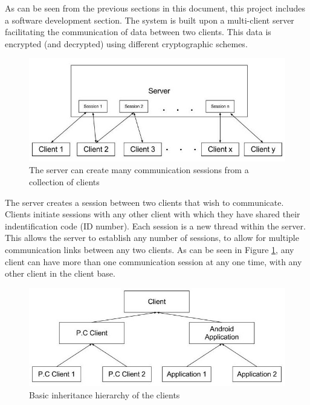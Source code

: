 \documentclass[a4paper,11pt]{article}
\begin{document}
As can be seen from the previous sections in this document, this project includes a software development section. The system is built upon a multi-client server facilitating the communication of data between two clients.  This data is encrypted (and decrypted) using different cryptographic schemes.

\begin{figure}[htb]
\centering
\includegraphics[scale=0.35]{designs1.jpg}
\caption{The server can create many communication sessions from a collection of clients}
\label{fig:designs1}
\end{figure}

The server creates a session between two clients that wish to communicate. Clients initiate sessions with any other client with which they have shared their indentification code (ID number). Each session is a new thread within the server. This allows the server to establish any number of sessions, to allow for multiple communication links between any two clients. As can be seen in Figure \ref{fig:designs1}, any client can have more than one communication session at any one time, with any other client in the client base.

\begin{figure}[htb]
\centering
\includegraphics[scale=0.35]{designs2.jpg}
\caption{Basic inheritance hierarchy of the clients}
\label{fig:designs2}
\end{figure}
\end{document}
